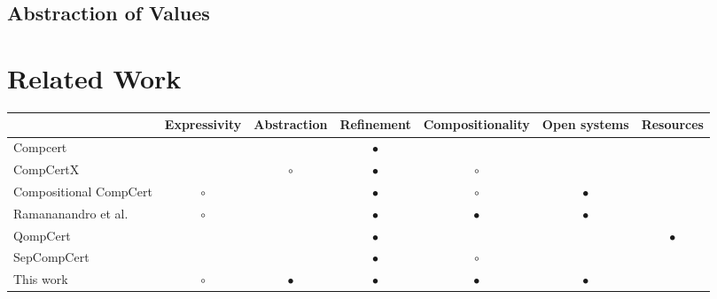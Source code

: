 \documentclass[sigplan,10pt,review,anonymous]{acmart}
\begin{document}
\subsection{Abstraction of Values} %


\section{Related Work} %

\begin{table*}
  \begin{tabular}{lcccccc}
    \hline
    & Expressivity & Abstraction & Refinement & Compositionality & Open systems & Resources \\
    \hline
    Compcert \cite{compcert}
      &           &           & $\bullet$ &           &           & \\
    CompCertX \cite{popl2015}
      &           & $\circ$   & $\bullet$ & $\circ$   &           & \\
    Compositional CompCert \cite{compcompcert}
      & $\circ$   &           & $\bullet$ & $\circ$   & $\bullet$ & \\
    Ramananandro et al. \cite{cpp2015}
      & $\circ$   &           & $\bullet$ & $\bullet$ & $\bullet$ & \\
    QompCert \cite{qompcert}
      &           &           & $\bullet$ &           &           & $\bullet$ \\
    SepCompCert \cite{lwsc}
      &           &           & $\bullet$ & $\circ$   &           & \\
    This work
      & $\circ$   & $\bullet$ & $\bullet$ & $\bullet$ & $\bullet$ & \\
    \hline
  \end{tabular}
\end{table*}



\end{document}
